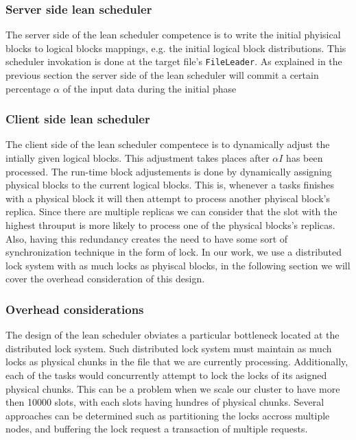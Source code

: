 \subsubsection{Server side lean scheduler}
The server side of the lean scheduler competence is to write the initial phyisical blocks to logical blocks mappings, e.g. the initial logical block distributions. This scheduler invokation is done at the target file's \texttt{FileLeader}. As explained in the previous section the server side of the lean scheduler will commit a certain percentage $\alpha$ of the input data during the initial phase 

\subsubsection{Client side lean scheduler}
The client side of the lean scheduler compentece is to dynamically adjust the intially given logical blocks. This adjustment takes places after $\alpha I$ has been processed. The run-time block adjustements is done by dynamically assigning physical blocks to the current logical blocks. This is, whenever a tasks finishes with a physical block it will then attempt to process another phyiscal block's replica. Since there are multiple replicas we can consider that the slot with the highest throuput is more likely to process one of the physical blocks's replicas. Also, having this redundancy creates the need to have some sort of synchronization technique in the form of lock. In our work, we use a distributed lock system with as much locks as phyiscal blocks, in the following section we will cover the overhead consideration of this design.


\subsubsection{Overhead considerations}
The design of the lean scheduler obviates a particular bottleneck located at the distributed lock system. Such distributed lock system must maintain as much locks as physical chunks in the file that 
we are currently processing. Additionally, each of the tasks would concurrently attempt to lock the locks of its asigned physical chunks. This can be a problem when we scale our cluster to have more then 10000 slots, with each slots having hundres of physical chunks. Several approaches can be determined such as partitioning the locks accross multiple nodes, and buffering the lock request a transaction of multiple requests.  

